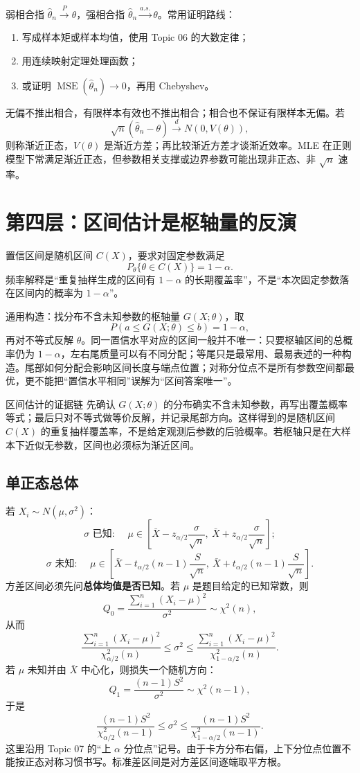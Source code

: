 \documentclass[11pt,a4paper]{ctexart}
\newcommand{\kw}[1]{\textbf{\color{deep}#1}}
\begin{document}
弱相合指 $\widehat\theta_n\xrightarrow{P}\theta$，强相合指 $\widehat\theta_n\xrightarrow{a.s.}\theta$。常用证明路线：
\begin{enumerate}
  \item 写成样本矩或样本均值，使用 Topic 06 的大数定律；
  \item 用连续映射定理处理函数；
  \item 或证明 $\operatorname{MSE}(\widehat\theta_n)\to0$，再用 Chebyshev。
\end{enumerate}
无偏不推出相合，有限样本有效也不推出相合；相合也不保证有限样本无偏。若
\[
\sqrt n(\widehat\theta_n-\theta)\xrightarrow{d}N(0,V(\theta)),
\]
则称渐近正态，$V(\theta)$ 是渐近方差；再比较渐近方差才谈渐近效率。MLE 在正则模型下常满足渐近正态，但参数相关支撑或边界参数可能出现非正态、非 $\sqrt n$ 速率。

\section{第四层：区间估计是枢轴量的反演}

置信区间是随机区间 $C(X)$，要求对固定参数满足
\[
P_\theta\{\theta\in C(X)\}=1-\alpha.
\]
频率解释是“重复抽样生成的区间有 $1-\alpha$ 的长期覆盖率”，不是“本次固定参数落在区间内的概率为 $1-\alpha$”。

通用构造：找分布不含未知参数的枢轴量 $G(X;\theta)$，取
\[
P(a\leq G(X;\theta)\leq b)=1-\alpha,
\]
再对不等式反解 $\theta$。同一置信水平对应的区间一般并不唯一：只要枢轴区间的总概率仍为 $1-\alpha$，左右尾质量可以有不同分配；等尾只是最常用、最易表述的一种构造。尾部如何分配会影响区间长度与端点位置；对称分位点不是所有参数空间都最优，更不能把“置信水平相同”误解为“区间答案唯一”。

\begin{methodbox}{区间估计的证据链}
先确认 $G(X;\theta)$ 的分布确实不含未知参数，再写出覆盖概率等式；最后只对不等式做等价反解，并记录尾部方向。这样得到的是随机区间 $C(X)$ 的重复抽样覆盖率，不是给定观测后参数的后验概率。若枢轴只是在大样本下近似无参数，区间也必须标为渐近区间。
\end{methodbox}

\subsection{单正态总体}

若 $X_i\sim N(\mu,\sigma^2)$：
\[
\sigma\text{ 已知: }\quad
\mu\in\left[\bar X-z_{\alpha/2}\frac\sigma{\sqrt n},\ \bar X+z_{\alpha/2}\frac\sigma{\sqrt n}\right];
\]
\[
\sigma\text{ 未知: }\quad
\mu\in\left[\bar X-t_{\alpha/2}(n-1)\frac S{\sqrt n},\ \bar X+t_{\alpha/2}(n-1)\frac S{\sqrt n}\right].
\]
方差区间必须先问\kw{总体均值是否已知}。若 $\mu$ 是题目给定的已知常数，则
\[
Q_0=\frac{\sum_{i=1}^n(X_i-\mu)^2}{\sigma^2}\sim\chi^2(n),
\]
从而
\[
\boxed{\frac{\sum_{i=1}^n(X_i-\mu)^2}{\chi^2_{\alpha/2}(n)}\leq\sigma^2\leq
\frac{\sum_{i=1}^n(X_i-\mu)^2}{\chi^2_{1-\alpha/2}(n)}}.
\]
若 $\mu$ 未知并由 $\bar X$ 中心化，则损失一个随机方向：
\[
Q_1=\frac{(n-1)S^2}{\sigma^2}\sim\chi^2(n-1),
\]
于是
\[
\boxed{\frac{(n-1)S^2}{\chi^2_{\alpha/2}(n-1)}\leq\sigma^2\leq\frac{(n-1)S^2}{\chi^2_{1-\alpha/2}(n-1)}}.
\]
这里沿用 Topic 07 的“上 $\alpha$ 分位点”记号。由于卡方分布右偏，上下分位点位置不能按正态对称习惯书写。标准差区间是对方差区间逐端取平方根。
\end{document}
